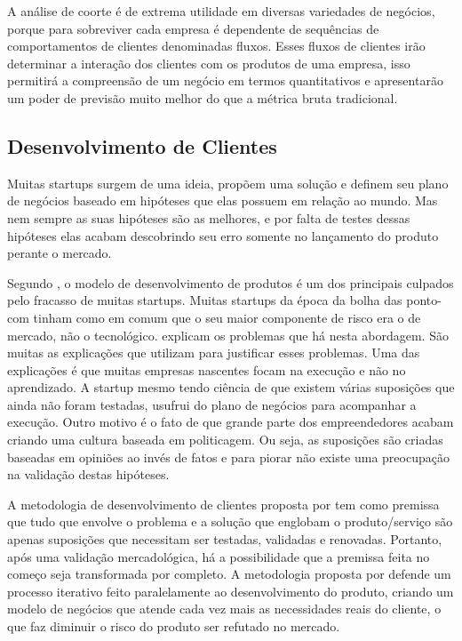 A análise de coorte é de extrema utilidade em diversas variedades de negócios, porque para sobreviver cada empresa é dependente de sequências de comportamentos de clientes denominadas fluxos. Esses fluxos de clientes irão determinar a interação dos clientes com os produtos de uma empresa, isso permitirá a compreensão de um negócio em termos quantitativos e apresentarão um poder de previsão muito melhor do que a métrica bruta tradicional. \cite{leanstartup}

\subsection{Desenvolvimento de Clientes}
\label{cha:desenvolvimento_de_clientes}
Muitas startups surgem de uma ideia, propõem uma solução e definem seu plano de negócios baseado em hipóteses que elas possuem em relação ao mundo. Mas nem sempre as suas hipóteses são as melhores, e por falta de testes dessas hipóteses elas acabam descobrindo seu erro somente no lançamento do produto perante o mercado.

Segundo , o modelo de desenvolvimento de produtos é um dos principais culpados pelo fracasso de muitas startups. Muitas startups da época da bolha das ponto-com tinham como  em comum que o seu maior componente de risco era o de mercado, não o tecnológico.  explicam os problemas que há nesta abordagem. São muitas as explicações que  utilizam para justificar esses problemas. Uma das explicações é que muitas empresas nascentes focam na execução e não no aprendizado. A startup mesmo tendo ciência de que existem várias suposições que ainda não foram testadas, usufrui do plano de negócios para acompanhar a execução. Outro motivo é o fato de que grande parte dos empreendedores acabam criando uma cultura baseada em politicagem. Ou seja, as suposições são criadas baseadas em opiniões ao invés de fatos e para piorar não existe uma preocupação na validação destas hipóteses.

A metodologia de desenvolvimento de clientes proposta por  tem como premissa que tudo que envolve o problema e a solução que englobam o produto/serviço são apenas suposições que necessitam ser testadas, validadas e renovadas. Portanto, após uma validação mercadológica, há a possibilidade que a premissa feita no começo seja transformada por completo. A metodologia proposta por  defende um processo iterativo feito paralelamente ao desenvolvimento do produto, criando um modelo de negócios que atende cada vez mais as necessidades reais do cliente, o que faz diminuir o risco do produto ser refutado no mercado.

